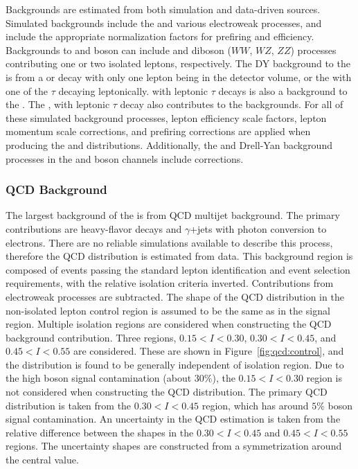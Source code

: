 Backgrounds are estimated from both simulation and data-driven sources. Simulated backgrounds include the \ttbar and various electroweak processes, and include the appropriate normalization factors for prefiring and efficiency. Backgrounds to \W and \Z boson can include \ttbar and diboson ($WW$, $WZ$, $ZZ$) processes contributing one or two isolated leptons, respectively. The DY background to the \W is from a \zmm or \zee decay with only one lepton being in the detector volume, or the \ztt with one of the $\tau$ decaying leptonically. \ztt with leptonic $\tau$ decays is also a background to the \Z. The \wtau, with leptonic $\tau$ decay also contributes to the \W backgrounds.
For all of these simulated background processes, lepton efficiency scale factors, lepton momentum scale corrections, and prefiring corrections are applied when producing the \mt and \mll distributions. Additionally, the \wtau and Drell-Yan background processes in the \Wp and \Wm boson channels include \met corrections.


 
\subsubsection{QCD Background}\label{ch:w:qcd}
The largest background of the \W is from QCD multijet background. The primary contributions are heavy-flavor decays and $\gamma$+jets with photon conversion to electrons. There are no reliable simulations available to describe this process, therefore the QCD  \mt distribution is estimated from data. This background region is composed of events passing the standard lepton identification and event selection requirements, with the relative isolation criteria inverted. Contributions from electroweak processes are subtracted. The shape of the QCD \mt distribution in the non-isolated lepton control region is assumed to be the same as in the signal region. Multiple isolation regions are considered when constructing the QCD background contribution. Three regions, $0.15 < I < 0.30$, $0.30 < I < 0.45$, and $0.45 < I < 0.55$ are considered. These are shown in Figure~\ref{fig:qcd:control}, and the \mt distribution is found to be generally independent of isolation region. Due to the high \W boson signal contamination (about $30\%$), the $0.15 < I < 0.30$ region is not considered when constructing the QCD \mt distribution. The primary QCD \mt distribution is taken from the $0.30 < I < 0.45$ region, which has around $5\%$ \W boson signal contamination. An uncertainty in the QCD estimation is taken from the relative difference between the \mt shapes in the $0.30 < I < 0.45$ and $0.45 < I < 0.55$ regions. The uncertainty shapes are constructed from a symmetrization around the central value.


